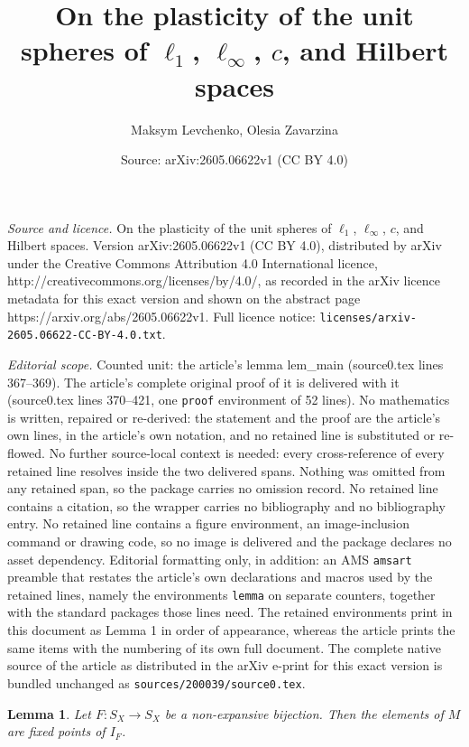 \documentclass[10pt,a4paper]{amsart}
\title{On the plasticity of the unit spheres of $\ell_1$, $\ell_{\infty}$, $c$, and Hilbert spaces}
\author{Maksym Levchenko, Olesia Zavarzina}
\date{Source: arXiv:2605.06622v1 (CC BY 4.0)}
\newtheorem{lemma}{Lemma}
\begin{document}
\maketitle

\noindent\emph{Source and licence.} On the plasticity of the unit spheres of $\ell_1$, $\ell_{\infty}$, $c$, and Hilbert spaces. Version arXiv:2605.06622v1 (CC BY 4.0), distributed by arXiv under the Creative Commons Attribution 4.0 International licence, http://creativecommons.org/licenses/by/4.0/, as recorded in the arXiv licence metadata for this exact version and shown on the abstract page https://arxiv.org/abs/2605.06622v1. Full licence notice: \texttt{licenses/arxiv-2605.06622-CC-BY-4.0.txt}.\par\smallskip

\noindent\textit{Editorial scope.} Counted unit: the article's lemma lem\_main (source0.tex lines 367--369). The article's complete original proof of it is delivered with it (source0.tex lines 370--421, one \texttt{proof} environment of 52 lines). No mathematics is written, repaired or re-derived: the statement and the proof are the article's own lines, in the article's own notation, and no retained line is substituted or re-flowed.  No further source-local context is needed: every cross-reference of every retained line resolves inside the two delivered spans.  Nothing was omitted from any retained span, so the package carries no omission record.  No retained line contains a citation, so the wrapper carries no bibliography and no bibliography entry.  No retained line contains a figure environment, an image-inclusion command or drawing code, so no image is delivered and the package declares no asset dependency.  Editorial formatting only, in addition: an AMS \texttt{amsart} preamble that restates the article's own declarations and macros used by the retained lines, namely the environments \texttt{lemma} on separate counters, together with the standard packages those lines need.  The retained environments print in this document as Lemma 1 in order of appearance, whereas the article prints the same items with the numbering of its own full document.  The complete native source of the article as distributed in the arXiv e-print for this exact version is bundled unchanged as \texttt{sources/200039/source0.tex}.
\begin{lemma}\label{lem_main}
    Let $F: S_X\rightarrow S_X$ be a non-expansive bijection. Then the elements of $M$ are fixed points of $I_F$.
\end{lemma}
\end{document}

